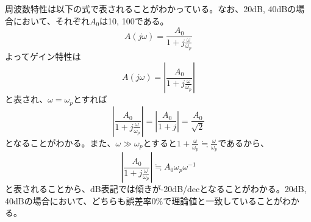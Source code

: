 \documentclass{ltjsarticle}
\begin{document}
周波数特性は以下の式で表されることがわかっている。なお、20dB, 40dBの場合において、それぞれ$A_0$は10, 100である。
$$
A(j\omega) = \frac{A_0}{1+j\frac{\omega}{\omega_p}}
$$
よってゲイン特性は
$$
A(j\omega) = \left|\frac{A_0}{1+j\frac{\omega}{\omega_p}}\right|
$$
と表され、$\omega=\omega_p$とすれば
$$
\left|\frac{A_0}{1+j\frac{\omega}{\omega_p}}\right| = \left|\frac{A_0}{1+j}\right| = \frac{A_0}{\sqrt{2}}
$$
となることがわかる。また、$\omega \gg \omega_p$とすると$1+\frac{\omega}{\omega_p} \fallingdotseq \frac{\omega}{\omega_p}$であるから、
$$
\left|\frac{A_0}{1+j\frac{\omega}{\omega_p}}\right| \fallingdotseq A_0\omega_p\omega^{-1}
$$
と表されることから、dB表記では傾きが-20dB/decとなることがわかる。20dB, 40dBの場合において、どちらも誤差率0\%で理論値と一致していることがわかる。\\~\\
\end{document}
